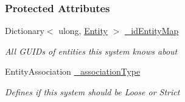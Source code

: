 \subsubsection*{Protected Attributes}
\begin{DoxyCompactItemize}
\item 
Dictionary$<$ ulong, \hyperlink{class_m_b2_d_1_1_entity_component_1_1_entity}{Entity} $>$ \hyperlink{class_m_b2_d_1_1_entity_component_1_1_entity_system_a7415c4bff1132bb4dadcc1a072c663da}{\+\_\+id\+Entity\+Map}
\begin{DoxyCompactList}\small\item\em All G\+U\+ID\textquotesingle{}s of entities this system knows about \end{DoxyCompactList}\item 
Entity\+Association \hyperlink{class_m_b2_d_1_1_entity_component_1_1_entity_system_a1e5512e27d2cf3f40dcf8f39975ca1d7}{\+\_\+association\+Type}
\begin{DoxyCompactList}\small\item\em Defines if this system should be Loose or Strict \end{DoxyCompactList}\end{DoxyCompactItemize}
